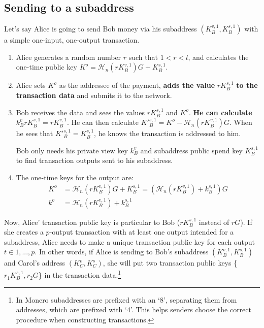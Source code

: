\subsection{Sending to a subaddress}
    
Let's say Alice is going to send Bob money via his subaddress $(K_B^{v,1}, K_B^{s,1})$ with a simple one-input, one-output transaction.
\begin{enumerate}
	\item Alice generates a random number $r$ such that $1 < r < l$, and calculates the one-time public key $K^o  = \mathcal{H}_n(r K_B^{v,1})G + K_B^{s,1}$.

	\item Alice sets $K^o$ as the addressee of the payment, \textbf{adds the value} $r K_B^{s,1}$ \textbf{to the transaction data} and submits it to the network.
	
	\item Bob receives the data and sees the values $r K_B^{s,1}$ and $K^o$. \textbf{He can calculate} $k_B^v r K_B^{s,1} = r K_B^{v,1}$. He can then calculate $K'^{s,1}_B = K^o - \mathcal{H}_n(r K_B^{v,1})G$. When he sees that $K'^{s,1}_B = K^{s,1}_B$, he knows the transaction is addressed to him.
	
	Bob only needs his private view key $k_B^v$ and subaddress public spend key $K^{s,1}_B$ to find transaction outputs sent to his subaddress.
	
	\item The one-time keys for the output are:
	\begin{align*}
		K^o &= \mathcal{H}_n(r K_B^{v,1})G + K_B^{s,1} = (\mathcal{H}_n(r K_B^{v,1}) + k_B^{s,1})G  \\ 
		k^o &= \mathcal{H}_n(r K_B^{v,1}) + k_B^{s,1}
	\end{align*}
\end{enumerate}

Now, Alice' transaction public key is particular to Bob ($r K_B^{s,1}$ instead of $r G$). If she creates a $p$-output transaction with at least one output intended for a subaddress, Alice needs to make a unique transaction public key for each output $t \in 1,...,p$. In other words, if Alice is sending to Bob's subaddress $(K_B^{v,1}, K_B^{s,1})$ and Carol's address $(K_C^v, K_C^s)$, she will put two transaction public keys \{$r_1 K_B^{s,1},r_2 G$\} in the transaction data.\footnote{In Monero subaddresses are prefixed with an ‘8’, separating them from addresses, which are prefixed with ‘4’. This helps senders choose the correct procedure when constructing transactions.}


